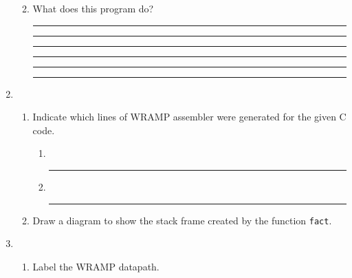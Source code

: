 \documentclass[a4paper,10pt]{article}
\begin{document}
\begin{enumerate}
\begin{enumerate}
\begin{center}
\begin{tabular}{|c|c|c|c|}
\end{tabular}
\end{center}

\item What does this program do?

\vspace{7mm}\hrule\vspace{7mm}\hrule\vspace{7mm}\hrule\vspace{7mm}\hrule
\vspace{7mm}\hrule\vspace{7mm}\hrule\vspace{3mm}

\end{enumerate}

\newpage
\item~
\begin{enumerate}
\item Indicate which lines of WRAMP assembler were generated for the given C code.

\begin{enumerate}
\item~
\vspace{7mm}\hrule\vspace{3mm}
\item~
\vspace{7mm}\hrule\vspace{3mm}

\end{enumerate}

\item Draw a diagram to show the stack frame created by the function
\texttt{fact}.

\begin{center}
\end{center}

\end{enumerate}

\newpage
\item~
\begin{enumerate}

\item Label the WRAMP datapath.
\vspace{1cm}

\begin{figure}[h]
\begin{center}
     \label{fig:wrampblok}
  \end{center}
\end{figure}
\vspace{1cm}


\end{enumerate}
\end{enumerate}
\end{document}
